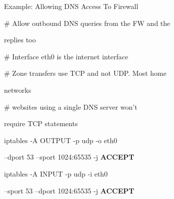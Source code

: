 \begin{frame}[t,allowframebreaks]{Example: Allowing DNS Access To Firewall}
  \fontsize{15}{18}\selectfont
  \vspace{0.08cm}
  {\color{CommandGreen}\ttfamily\fontsize{13.5}{16.5}\selectfont \# Allow outbound DNS queries from the FW and the\par}
  replies too\par
  \vspace{0.08cm}
  {\color{CommandGreen}\ttfamily\fontsize{13.5}{16.5}\selectfont \# Interface eth0 is the internet interface\par}
  \vspace{0.08cm}
  {\color{CommandGreen}\ttfamily\fontsize{13.5}{16.5}\selectfont \# Zone transfers use TCP and not UDP. Most home\par}
  networks\par
  \vspace{0.08cm}
  {\color{CommandGreen}\ttfamily\fontsize{13.5}{16.5}\selectfont \# websites using a single DNS server won't\par}
  require TCP statements\par
  \vspace{0.08cm}
  {\color{CommandGreen}\ttfamily\fontsize{13.5}{16.5}\selectfont iptables -A OUTPUT -p udp -o eth0\par}
  --dport 53 --sport 1024:65535 -j \textcolor{WarningColor}{\bfseries ACCEPT}\par
  \vspace{0.08cm}
  {\color{CommandGreen}\ttfamily\fontsize{13.5}{16.5}\selectfont iptables -A INPUT -p udp -i eth0\par}
  --sport 53 --dport 1024:65535 -j \textcolor{WarningColor}{\bfseries ACCEPT}\par
\end{frame}
